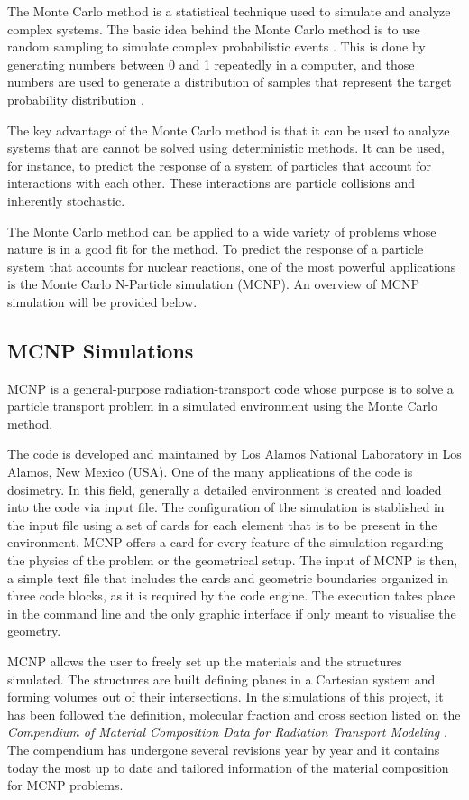 \label{section: Monte Carlo Method}
The Monte Carlo method is a statistical technique used to simulate and analyze complex systems. The basic idea behind the Monte Carlo method is to use random sampling to simulate complex probabilistic events \cite{MonteCarloMethods}. This is done by generating numbers between 0 and 1 repeatedly in a computer, and those numbers are used to generate a distribution of samples that represent the target probability distribution \cite{MonteCarloMethods}.

The key advantage of the Monte Carlo method is that it can be used to analyze systems that are cannot be solved using deterministic methods. It can be used, for instance, to predict the response of a system of particles that account for interactions with each other. These interactions are particle collisions and inherently stochastic.

The Monte Carlo method can be applied to a wide variety of problems whose nature is in a good fit for the method. To predict the response of a particle system that accounts for nuclear reactions, one of the most powerful applications is the Monte Carlo N-Particle simulation (MCNP). An overview of MCNP simulation will be provided below.


\subsection{MCNP Simulations}
\label{subsection:MCNP Simulations}
MCNP is a general-purpose radiation-transport code whose purpose is to solve a particle transport problem in a simulated environment using the Monte Carlo method. \cite{mcnp5Manual}

The code is developed and maintained by Los Alamos National Laboratory in Los Alamos, New Mexico (USA). One of the many applications of the code is dosimetry. In this field, generally a detailed environment is created and loaded into the code via input file. The configuration of the simulation is stablished in the input file using a set of cards for each element that is to be present in the environment. MCNP offers a card for every feature of the simulation regarding the physics of the problem or the geometrical setup. The input of MCNP is then, a simple text file that includes the cards and geometric boundaries organized in three code blocks, as it is required by the code engine. The execution takes place in the command line and the only graphic interface if only meant to visualise the geometry.

MCNP allows the user to freely set up the materials and the structures simulated. The structures are built defining planes in a Cartesian system and forming volumes out of their intersections. In the simulations of this project, it has been followed the definition, molecular fraction and cross section listed on the \textit{Compendium of Material Composition Data for Radiation Transport Modeling} \cite{matcomposition}. The compendium has undergone several revisions year by year and it contains today the most up to date and tailored information of the material composition for MCNP problems. 

